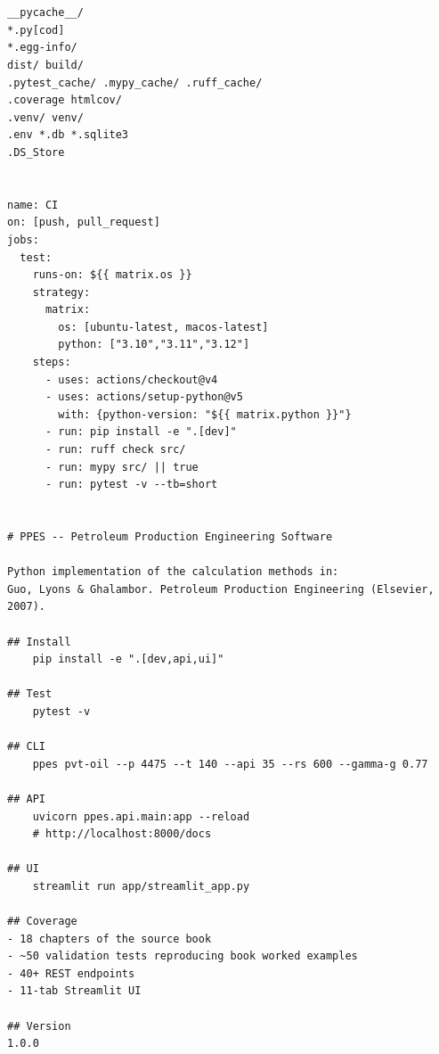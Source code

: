 \documentclass[10pt,a4paper,openany]{book}
\begin{document}
\chapter{}
\begin{lstlisting}[style=plain]
__pycache__/
*.py[cod]
*.egg-info/
dist/ build/
.pytest_cache/ .mypy_cache/ .ruff_cache/
.coverage htmlcov/
.venv/ venv/
.env *.db *.sqlite3
.DS_Store
\end{lstlisting}

\chapter{}
\begin{lstlisting}[style=plain]
name: CI
on: [push, pull_request]
jobs:
  test:
    runs-on: ${{ matrix.os }}
    strategy:
      matrix:
        os: [ubuntu-latest, macos-latest]
        python: ["3.10","3.11","3.12"]
    steps:
      - uses: actions/checkout@v4
      - uses: actions/setup-python@v5
        with: {python-version: "${{ matrix.python }}"}
      - run: pip install -e ".[dev]"
      - run: ruff check src/
      - run: mypy src/ || true
      - run: pytest -v --tb=short
\end{lstlisting}

\chapter{}
\begin{lstlisting}[style=plain]
# PPES -- Petroleum Production Engineering Software

Python implementation of the calculation methods in:
Guo, Lyons & Ghalambor. Petroleum Production Engineering (Elsevier, 2007).

## Install
    pip install -e ".[dev,api,ui]"

## Test
    pytest -v

## CLI
    ppes pvt-oil --p 4475 --t 140 --api 35 --rs 600 --gamma-g 0.77

## API
    uvicorn ppes.api.main:app --reload
    # http://localhost:8000/docs

## UI
    streamlit run app/streamlit_app.py

## Coverage
- 18 chapters of the source book
- ~50 validation tests reproducing book worked examples
- 40+ REST endpoints
- 11-tab Streamlit UI

## Version
1.0.0
\end{lstlisting}
\end{document}

